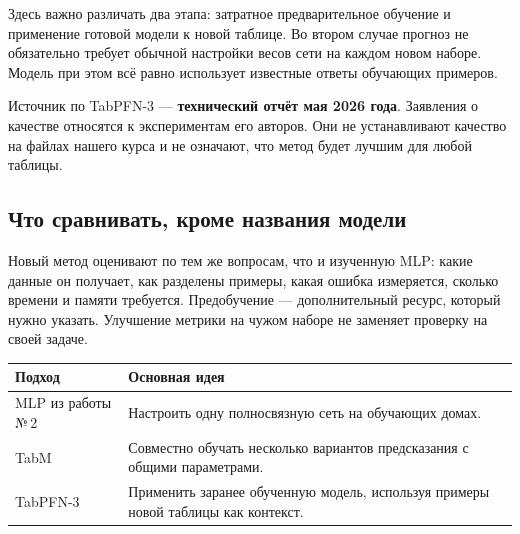Здесь важно различать два этапа: затратное предварительное обучение и применение готовой модели к новой таблице. Во втором случае прогноз не обязательно требует обычной настройки весов сети на каждом новом наборе. Модель при этом всё равно использует известные ответы обучающих примеров.

Источник по TabPFN-3 --- \textbf{технический отчёт мая 2026 года}. Заявления о качестве относятся к экспериментам его авторов. Они не устанавливают качество на файлах нашего курса и не означают, что метод будет лучшим для любой таблицы.

\clearpage
\subsection*{Что сравнивать, кроме названия модели}
Новый метод оценивают по тем же вопросам, что и изученную MLP: какие данные он получает, как разделены примеры, какая ошибка измеряется, сколько времени и памяти требуется. Предобучение --- дополнительный ресурс, который нужно указать. Улучшение метрики на чужом наборе не заменяет проверку на своей задаче.

\begin{table}[H]\centering\small
\begin{tabularx}{\textwidth}{@{}p{}Y@{}}
\toprule
Подход & Основная идея \\
\midrule
MLP из работы №\,2 & Настроить одну полносвязную сеть на обучающих домах. \\
TabM & Совместно обучать несколько вариантов предсказания с общими параметрами. \\
TabPFN-3 & Применить заранее обученную модель, используя примеры новой таблицы как контекст. \\
\bottomrule
\end{tabularx}
\end{table}

